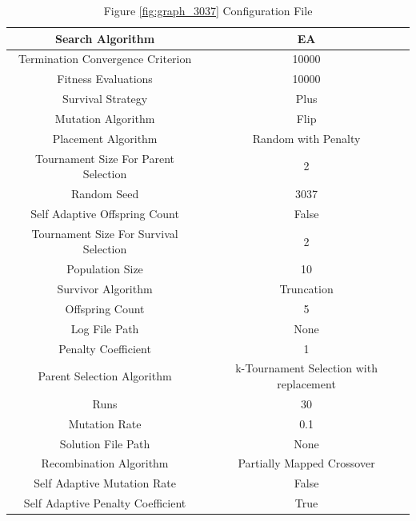\documentclass{standalone}
\begin{document}
\begin{table}[!htb]
	\centering
	\caption{Figure \ref{fig:graph_3037} Configuration File}
	\label{tab:graph_3037}
	\begin{tabular}{| c | c |}
		\hline
		Search Algorithm		& EA		 \\
		\hline
		Termination Convergence Criterion		& 10000		 \\
		\hline
		Fitness Evaluations		& 10000		 \\
		\hline
		Survival Strategy		& Plus		 \\
		\hline
		Mutation Algorithm		& Flip		 \\
		\hline
		Placement Algorithm		& Random with Penalty		 \\
		\hline
		Tournament Size For Parent Selection		& 2		 \\
		\hline
		Random Seed		& 3037		 \\
		\hline
		Self Adaptive Offspring Count		& False		 \\
		\hline
		Tournament Size For Survival Selection		& 2		 \\
		\hline
		Population Size		& 10		 \\
		\hline
		Survivor Algorithm		& Truncation		 \\
		\hline
		Offspring Count		& 5		 \\
		\hline
		Log File Path		& None		 \\
		\hline
		Penalty Coefficient		& 1		 \\
		\hline
		Parent Selection Algorithm		& k-Tournament Selection with replacement		 \\
		\hline
		Runs		& 30		 \\
		\hline
		Mutation Rate		& 0.1		 \\
		\hline
		Solution File Path		& None		 \\
		\hline
		Recombination Algorithm		& Partially Mapped Crossover		 \\
		\hline
		Self Adaptive Mutation Rate		& False		 \\
		\hline
		Self Adaptive Penalty Coefficient		& True		 \\
		\hline
	\end{tabular}
\end{table}
\end{document}
